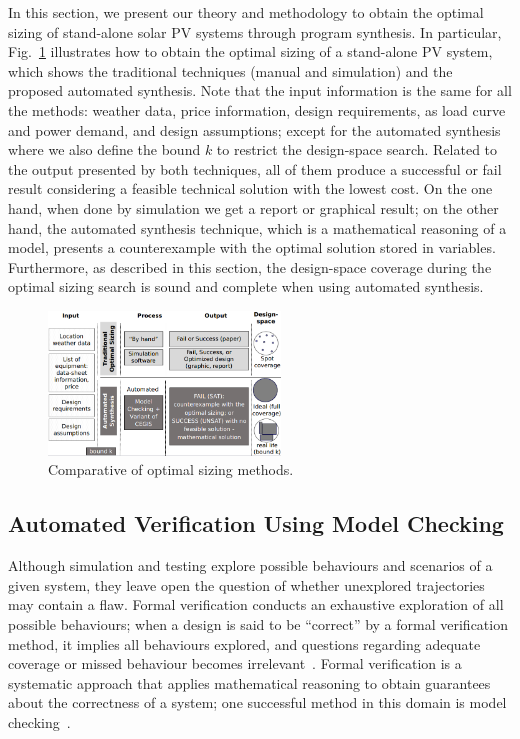 \documentclass[journal]{IEEEtran}
\begin{document}
In this section, we present our theory and methodology to obtain the optimal sizing of stand-alone solar PV systems through program synthesis. In particular, Fig.~\ref{fig:optimization} illustrates how to obtain the optimal sizing of a stand-alone PV system, which shows the traditional techniques (manual and simulation) and the proposed automated synthesis. Note that the input information is the same for all the methods: weather data, price information, design requirements, as load curve and power demand, and design assumptions; except for the automated synthesis where we also define the bound $k$ to restrict the design-space search. Related to the output presented by both techniques, all of them produce a successful or fail result considering a feasible technical solution with the lowest cost. On the one hand, when done by simulation we get a report or graphical result; on the other hand, the automated synthesis technique, which is a mathematical reasoning of a model, presents a counterexample with the optimal solution stored in variables. Furthermore, as described in this section, the design-space coverage during the optimal sizing search is sound and complete when using automated synthesis.
%
\begin{figure}[h]
\hspace*{-1cm}\includegraphics[width=0.55\textwidth]{optimalsizingprocess4}
\centering
\caption{Comparative of optimal sizing methods.}
\label{fig:optimization}
\end{figure}

\subsection{Automated Verification Using Model Checking}
\label{sec:AutomatedVerification}

Although simulation and testing explore possible behaviours and scenarios of a given system, they leave open the question of whether unexplored trajectories may contain a flaw. Formal verification conducts an exhaustive exploration of all possible behaviours; when a design is said to be ``correct'' by a formal verification method, it implies all behaviours explored, and questions regarding adequate coverage or missed behaviour becomes irrelevant~\cite{Clarke2012}. Formal verification is a systematic approach that applies mathematical reasoning to obtain guarantees about the correctness of a system; one successful method in this domain is model checking~\cite{Clarke2012}. 
\end{document}
